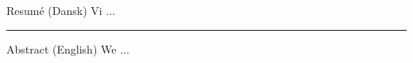 
\thispagestyle{chapter}

%
%

\begin{multiabstract}{Resumé (Dansk)}
\noindent Vi ...

\end{multiabstract}

\plainbreak{2}


%
%

\begin{multiabstract}{Abstract (English)} 
\noindent We ...

\end{multiabstract}





